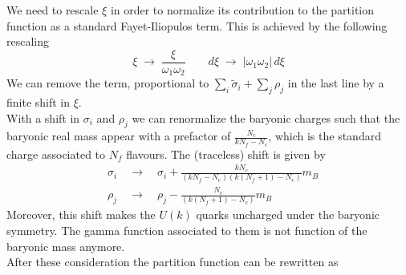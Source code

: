 We need to rescale $\xi$ in order to normalize its contribution to the partition function as a standard Fayet-Iliopulos term.
This is achieved by the following rescaling
\begin{equation}
 \xi \; \longrightarrow \; \frac{\xi}{\omega_1 \omega_2} \qquad 
 d \xi \; \longrightarrow \;  |\omega_1 \omega_2 | \, d \xi  
\end{equation}
We can remove the term, proportional to $\sum_i \tilde{\sigma}_i + \sum_j \rho_j $ in the last line by a finite shift in $\xi$.\\
With a shift in $\sigma_i $ and $\rho_j$ we can renormalize the baryonic charges such that the baryonic real mass appear with a prefactor of 
$ \frac{N_c}{k N_f - N_c}$, which is the standard charge associated to $N_f$ flavours.
The (traceless) shift is given by
\begin{equation}
 \begin{aligned}
	& \sigma_i \quad \longrightarrow \quad \sigma_i + \frac{k N_c }{(k N_f - N_c)(k (N_f+1) - N_c)} m_B \\
	& \rho_j \quad \longrightarrow \quad \rho_j - \frac{N_c }{(k (N_f+1) - N_c)} m_B
 \end{aligned}
 \end{equation} 
Moreover, this shift makes the $U(k)$ quarks uncharged under the baryonic symmetry. 
The gamma function associated to them is not function of the baryonic mass anymore.\\
After these consideration the partition function can be rewritten as
